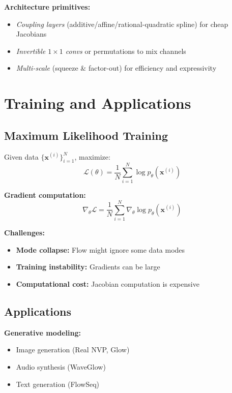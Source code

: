 \textbf{Architecture primitives:}
\begin{itemize}
    \item \emph{Coupling layers} (additive/affine/rational-quadratic spline) for cheap Jacobians
    \item \emph{Invertible $1\times 1$ convs} or permutations to mix channels
    \item \emph{Multi-scale} (squeeze \& factor-out) for efficiency and expressivity
\end{itemize}

\section{Training and Applications}

\subsection{Maximum Likelihood Training}

Given data $\{\mathbf{x}^{(i)}\}_{i=1}^N$, maximize:
\begin{equation}
    \mathcal{L}(\theta) = \frac{1}{N} \sum_{i=1}^N \log p_\theta(\mathbf{x}^{(i)})
\end{equation}

\textbf{Gradient computation:}
\begin{equation}
    \nabla_\theta \mathcal{L} = \frac{1}{N} \sum_{i=1}^N \nabla_\theta \log p_\theta(\mathbf{x}^{(i)})
\end{equation}

\textbf{Challenges:}
\begin{itemize}
    \item \textbf{Mode collapse:} Flow might ignore some data modes
    \item \textbf{Training instability:} Gradients can be large
    \item \textbf{Computational cost:} Jacobian computation is expensive
\end{itemize}

\subsection{Applications}

\textbf{Generative modeling:}
\begin{itemize}
    \item Image generation (Real NVP, Glow)
    \item Audio synthesis (WaveGlow)
    \item Text generation (FlowSeq)
\end{itemize}

